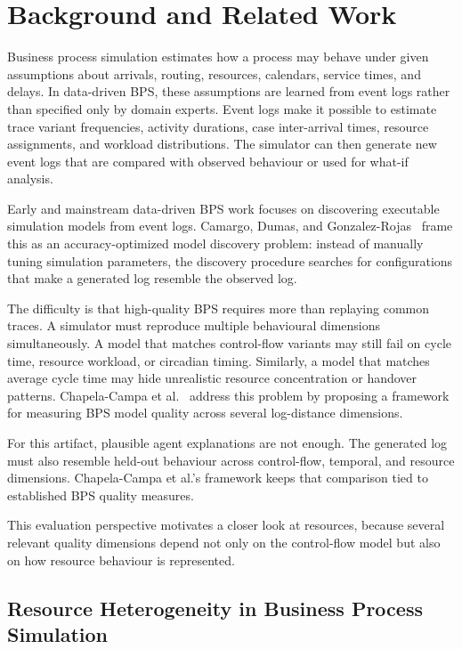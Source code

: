 \section{Background and Related
Work}\label{background-and-related-work}

Business process simulation estimates how a process may behave under
given assumptions about arrivals, routing, resources, calendars, service
times, and delays. In data-driven BPS, these assumptions are learned
from event logs rather than specified only by domain experts. Event logs
make it possible to estimate trace variant frequencies, activity
durations, case inter-arrival times, resource assignments, and workload
distributions. The simulator can then generate new event logs that are
compared with observed behaviour or used for what-if analysis.

Early and mainstream data-driven BPS work focuses on discovering
executable simulation models from event logs. Camargo, Dumas, and
Gonzalez-Rojas~\cite{camargo2020automated} frame this as an
accuracy-optimized model discovery problem: instead of manually tuning
simulation parameters, the discovery procedure searches for
configurations that make a generated log resemble the observed log.

The difficulty is that high-quality BPS requires more than replaying
common traces. A simulator must reproduce multiple behavioural dimensions
simultaneously. A model that matches control-flow variants may still
fail on cycle time, resource workload, or circadian timing. Similarly, a
model that matches average cycle time may hide unrealistic resource
concentration or handover patterns. Chapela-Campa et al.~\cite{chapela2025quality} address
this problem by proposing a framework for measuring BPS model quality
across several log-distance dimensions.

For this artifact, plausible agent explanations are not enough. The
generated log must also resemble held-out behaviour across control-flow,
temporal, and resource dimensions. Chapela-Campa et al.'s framework
keeps that comparison tied to established BPS quality measures.

This evaluation perspective motivates a closer look at resources,
because several relevant quality dimensions depend not only on the
control-flow model but also on how resource behaviour is represented.

\subsection{Resource Heterogeneity in Business Process
Simulation}\label{resource-heterogeneity-in-business-process-simulation}

